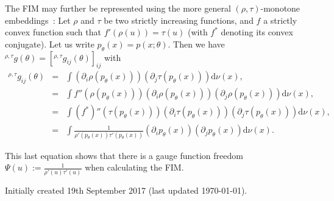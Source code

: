 \documentclass[11pt]{article}
\def\dnu{\mathrm{d}\nu}
\def\leftsup#1{{}^{#1}}
\begin{document}
The FIM may further be represented using the more general $(\rho,\tau)$-monotone embeddings~\cite{naudts2018rho}:
Let $\rho$ and $\tau$ be two strictly increasing functions, and $f$ a strictly convex function such that $f'(\rho(u))=\tau(u)$ (with $f^*$ denoting its convex conjugate).
Let us write $p_\theta(x)=p(x;\theta)$. Then we have $\leftsup{\rho,\tau}g(\theta)=[\leftsup{\rho,\tau}g_{ij}(\theta)]_{ij}$ with
\begin{eqnarray}
\leftsup{\rho,\tau}g_{ij}(\theta) &=& \int \left(\partial_i\rho(p_\theta(x))\right)   \left(\partial_j\tau(p_\theta(x))\right) \dnu(x),\\
&=& \int f''(\rho(p_\theta(x)))  \left(\partial_i\rho(p_\theta(x))\right) \left(\partial_j\rho(p_\theta(x))\right)\dnu(x),\\
&=& \int (f^*)''(\tau(p_\theta(x))) \left(\partial_i\tau(p_\theta(x))\right) \left(\partial_j\tau(p_\theta(x))\right) \dnu(x),\\
&=& \int \frac{1}{\rho'(p_\theta(x)) \tau'(p_\theta(x)) }  \left(\partial_i p_\theta(x) \right) \left(\partial_j p_\theta(x) \right)\dnu(x).
\end{eqnarray} 

This last equation shows that there is a gauge function freedom $\Psi(u):=\frac{1}{\rho'(u) \tau'(u) }$ when calculating the FIM.

\vskip 1cm
Initially created 19th September 2017 (last updated \today).



\end{document}
